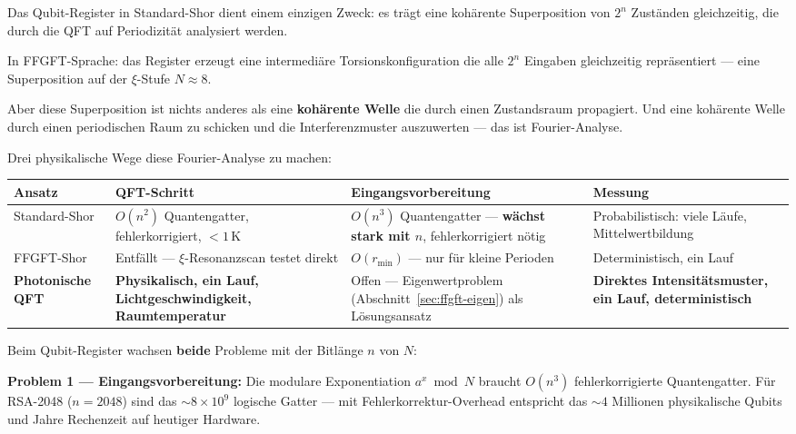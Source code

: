 \begin{foundation}
Das Qubit-Register in Standard-Shor dient einem
einzigen Zweck: es trägt eine kohärente Superposition
von $2^n$ Zuständen gleichzeitig, die durch die QFT
auf Periodizität analysiert werden.

In FFGFT-Sprache: das Register erzeugt eine
intermediäre Torsionskonfiguration die alle
$2^n$ Eingaben gleichzeitig repräsentiert ---
eine Superposition auf der $\xi$-Stufe $N \approx 8$.

Aber diese Superposition ist nichts anderes als
eine \textbf{kohärente Welle} die durch einen
Zustandsraum propagiert.
Und eine kohärente Welle durch einen periodischen
Raum zu schicken und die Interferenzmuster
auszuwerten --- das ist Fourier-Analyse.

Drei physikalische Wege diese Fourier-Analyse zu machen:

\begin{center}
\begin{tabular}{p{2.8cm}p{3.2cm}p{3.2cm}p{3.2cm}}
\toprule
\textbf{Ansatz} & \textbf{QFT-Schritt} &
\textbf{Eingangsvorbereitung} & \textbf{Messung} \\
\midrule
Standard-Shor &
$O(n^2)$ Quantengatter,
fehlerkorrigiert,
$< 1$\,K &
$O(n^3)$ Quantengatter ---
\textbf{wächst stark mit $n$},
fehlerkorrigiert nötig &
Probabilistisch:
viele Läufe,
Mittelwertbildung \\[8pt]
FFGFT-Shor &
Entfällt ---
$\xi$-Resonanzscan
testet direkt &
$O(r_\text{min})$ ---
nur für kleine Perioden &
Deterministisch,
ein Lauf \\[8pt]
\textbf{Photonische QFT} &
\textbf{Physikalisch,
ein Lauf,
Lichtgeschwindigkeit,
Raumtemperatur} &
Offen ---
Eigenwertproblem
(Abschnitt~\ref{sec:ffgft-eigen})
als Lösungsansatz &
\textbf{Direktes
Intensitätsmuster,
ein Lauf,
deterministisch} \\
\bottomrule
\end{tabular}
\end{center}

\begin{important}
Beim Qubit-Register wachsen \textbf{beide} Probleme
mit der Bitlänge $n$ von $N$:

\textbf{Problem 1 --- Eingangsvorbereitung:}
Die modulare Exponentiation $a^x \bmod N$
braucht $O(n^3)$ fehlerkorrigierte Quantengatter.
Für RSA-2048 ($n = 2048$) sind das
$\sim 8 \times 10^9$ logische Gatter ---
mit Fehlerkorrektur-Overhead entspricht das
$\sim 4$ Millionen physikalische Qubits
und Jahre Rechenzeit auf heutiger Hardware.


\end{important}
\end{foundation}
